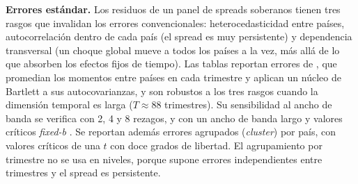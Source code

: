 \textbf{Errores estándar.} Los residuos de un panel de spreads soberanos tienen tres rasgos que invalidan los errores convencionales: heterocedasticidad entre países, autocorrelación dentro de cada país (el spread es muy persistente) y dependencia transversal (un choque global mueve a todos los países a la vez, más allá de lo que absorben los efectos fijos de tiempo). Las tablas reportan errores de \citet{DriscollKraay1998}, que promedian los momentos entre países en cada trimestre y aplican un núcleo de Bartlett a sus autocovarianzas, y son robustos a los tres rasgos cuando la dimensión temporal es larga ($T\approx88$ trimestres). Su sensibilidad al ancho de banda se verifica con 2, 4 y 8 rezagos, y con un ancho de banda largo y valores críticos \textit{fixed-b} \citep{KieferVogelsang2005}. Se reportan además errores agrupados (\textit{cluster}) por país, con valores críticos de una $t$ con doce grados de libertad. El agrupamiento por trimestre no se usa en niveles, porque supone errores independientes entre trimestres y el spread es persistente.

